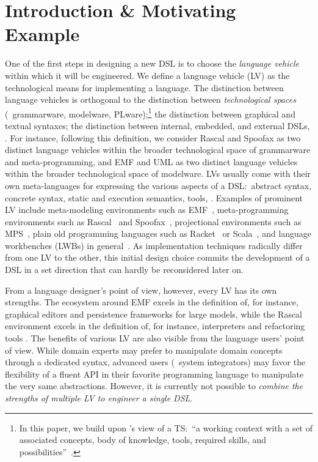 \documentclass[sigplan]{acmart}
\begin{document}
\section{Introduction \& Motivating Example}
One of the first steps in designing a new DSL is to choose the \emph{language vehicle} within which it will be engineered.
We define a language vehicle (LV) as the technological means for implementing a language.
The distinction between language vehicles is orthogonal to the distinction between \emph{technological spaces} (\eg~grammarware, modelware, PLware);\footnote{In this paper, we build upon \citeauthor{kurtev2002technological}'s view of a TS:~``a working context with a set of associated concepts, body of knowledge, tools, required skills, and possibilities''~\cite{kurtev2002technological}.} the distinction between graphical and textual syntaxes; the distinction between internal, embedded, and external DSLs, \etc.
For instance, following this definition, we consider Rascal and Spoofax as two distinct language vehicles within the broader technological space of grammarware and meta-programming, and EMF and UML as two distinct language vehicles within the broader technological space of modelware.
LVs usually come with their own meta-languages for expressing the various aspects of a DSL:~abstract syntax, concrete syntax, static and execution semantics, tools, \etc.
Examples of prominent LV include meta-modeling environments such as EMF~\cite{steinberg2008emf}, meta-programming environments such as Rascal~\cite{klint2010easy} and Spoofax~\cite{kats2010spoofax}, projectional environments such as MPS~\cite{voelter2013language}, plain old programming languages such as Racket~\cite{felleisen2018programmable} or Scala~\cite{hofer2010modular}, and language workbenches (LWBs) in general~\cite{erdweg2015evaluating}.
As implementation techniques radically differ from one LV to the other, this initial design choice commits the development of a DSL in a set direction that can hardly be reconsidered later on.

From a language designer's point of view, however, every LV has its own strengths.
The ecosystem around EMF excels in the definition of, for instance, graphical editors and persistence frameworks for large models, while the Rascal environment excels in the definition of, for instance, interpreters and refactoring tools .
The benefits of various LV are also visible from the language users' point of view.
While domain experts may prefer to manipulate domain concepts through a dedicated syntax, advanced users (\eg~system integrators) may favor the flexibility of a fluent API in their favorite programming language to manipulate the very same abstractions.
However, it is currently not possible to \emph{combine the strengths of multiple LV to engineer a single DSL}.
\end{document}
